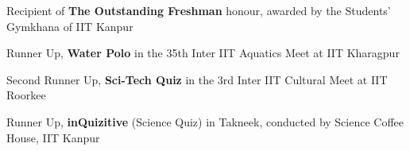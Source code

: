 \vspace{3mm}
\begin{cvitems}
  \item Recipient of \textbf{The Outstanding Freshman} honour, awarded by the Students' Gymkhana of IIT Kanpur \hfill {}
  \item Runner Up, \textbf{Water Polo} in the 35th Inter IIT Aquatics Meet at IIT Kharagpur \hfill {}
  \item Second Runner Up, \textbf{Sci-Tech Quiz} in the 3rd Inter IIT Cultural Meet at IIT Roorkee \hfill {}
  \item Runner Up, \textbf{inQuizitive} (Science Quiz) in Takneek, conducted by Science Coffee House, IIT Kanpur \hfill {}
\end{cvitems}
